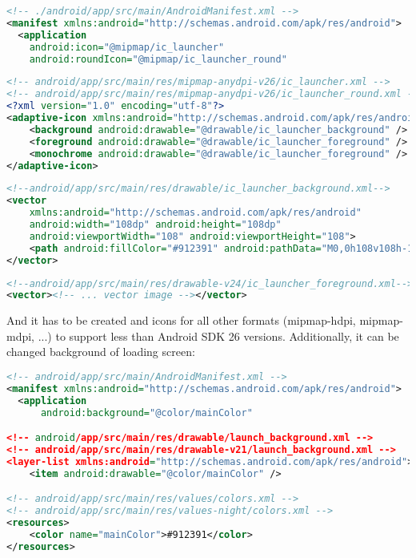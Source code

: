 \begin{lstlisting}[language=xml]
<!-- ./android/app/src/main/AndroidManifest.xml -->
<manifest xmlns:android="http://schemas.android.com/apk/res/android">
  <application
    android:icon="@mipmap/ic_launcher"
    android:roundIcon="@mipmap/ic_launcher_round"
\end{lstlisting}
\begin{lstlisting}[language=xml]
<!-- android/app/src/main/res/mipmap-anydpi-v26/ic_launcher.xml -->
<!-- android/app/src/main/res/mipmap-anydpi-v26/ic_launcher_round.xml -->
<?xml version="1.0" encoding="utf-8"?>
<adaptive-icon xmlns:android="http://schemas.android.com/apk/res/android">
    <background android:drawable="@drawable/ic_launcher_background" />
    <foreground android:drawable="@drawable/ic_launcher_foreground" />
    <monochrome android:drawable="@drawable/ic_launcher_foreground" />
</adaptive-icon>
\end{lstlisting}
\begin{lstlisting}[language=xml]
<!--android/app/src/main/res/drawable/ic_launcher_background.xml-->
<vector
    xmlns:android="http://schemas.android.com/apk/res/android"
    android:width="108dp" android:height="108dp"
    android:viewportWidth="108" android:viewportHeight="108">
    <path android:fillColor="#912391" android:pathData="M0,0h108v108h-108z" />
</vector>
\end{lstlisting}
\begin{lstlisting}[language=xml]
<!--android/app/src/main/res/drawable-v24/ic_launcher_foreground.xml-->
<vector><!-- ... vector image --></vector>
\end{lstlisting}

\noindent And it has to be created  and  icons for all other formats 
(mipmap-hdpi, mipmap-mdpi, ...) to support less than Android SDK 26 versions. Additionally, it can be changed 
background of loading screen:

\begin{lstlisting}[language=xml]
<!-- android/app/src/main/AndroidManifest.xml -->
<manifest xmlns:android="http://schemas.android.com/apk/res/android">
  <application
      android:background="@color/mainColor"

<!-- android/app/src/main/res/drawable/launch_background.xml -->
<!-- android/app/src/main/res/drawable-v21/launch_background.xml -->
<layer-list xmlns:android="http://schemas.android.com/apk/res/android">
    <item android:drawable="@color/mainColor" />

<!-- android/app/src/main/res/values/colors.xml -->
<!-- android/app/src/main/res/values-night/colors.xml -->
<resources>
    <color name="mainColor">#912391</color>
</resources>
\end{lstlisting}

